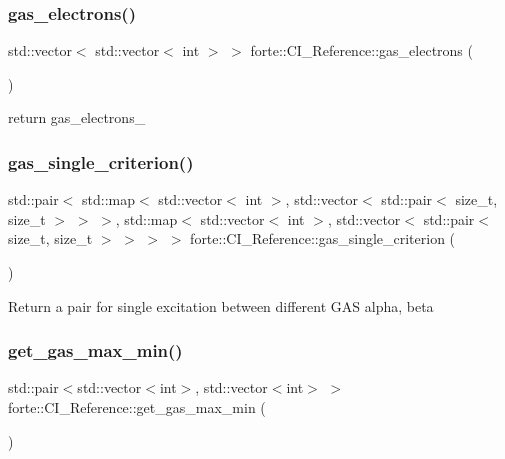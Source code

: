 \subsubsection{\texorpdfstring{gas\+\_\+electrons()}{gas\_electrons()}}
{\footnotesize\ttfamily std\+::vector$<$ std\+::vector$<$ int $>$ $>$ forte\+::\+C\+I\+\_\+\+Reference\+::gas\+\_\+electrons (\begin{DoxyParamCaption}{ }\end{DoxyParamCaption})}



return gas\+\_\+electrons\+\_\+ 

\mbox{\label{classforte_1_1_c_i___reference_af3414d78ff86d2a43d174b9f3a86b84f}} 
\subsubsection{\texorpdfstring{gas\+\_\+single\+\_\+criterion()}{gas\_single\_criterion()}}
{\footnotesize\ttfamily std\+::pair$<$ std\+::map$<$ std\+::vector$<$ int $>$, std\+::vector$<$ std\+::pair$<$ size\+\_\+t, size\+\_\+t $>$ $>$ $>$, std\+::map$<$ std\+::vector$<$ int $>$, std\+::vector$<$ std\+::pair$<$ size\+\_\+t, size\+\_\+t $>$ $>$ $>$ $>$ forte\+::\+C\+I\+\_\+\+Reference\+::gas\+\_\+single\+\_\+criterion (\begin{DoxyParamCaption}{ }\end{DoxyParamCaption})}

Return a pair for single excitation between different G\+AS alpha, beta \mbox{\label{classforte_1_1_c_i___reference_af0d91f0530121a3149dec3f6cca0cabc}} 
\subsubsection{\texorpdfstring{get\+\_\+gas\+\_\+max\+\_\+min()}{get\_gas\_max\_min()}}
{\footnotesize\ttfamily std\+::pair$<$std\+::vector$<$int$>$, std\+::vector$<$int$>$ $>$ forte\+::\+C\+I\+\_\+\+Reference\+::get\+\_\+gas\+\_\+max\+\_\+min (\begin{DoxyParamCaption}{ }\end{DoxyParamCaption})\hspace{0.3cm}{\ttfamily [protected]}}

